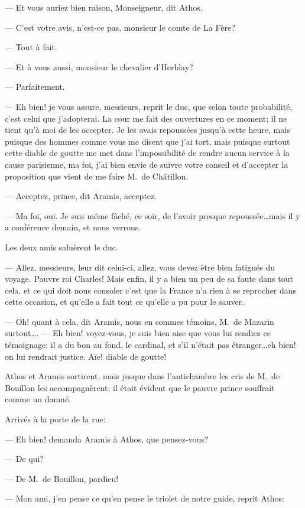 — Et vous auriez bien raison, Monseigneur, dit Athos.

— C'est votre avis, n'est-ce pas, monsieur le comte de La Fère?

— Tout à fait.

— Et à vous aussi, monsieur le chevalier d'Herblay?

— Parfaitement.

— Eh bien! je vous assure, messieurs, reprit le duc, que selon toute probabilité, c'est celui que j'adopterai. La cour me fait des ouvertures en ce moment; il ne tient qu'à moi de les accepter. Je les avais repoussées jusqu'à cette heure, mais puisque des hommes comme vous me disent que j'ai tort, mais puisque surtout cette diable de goutte me met dans l'impossibilité de rendre aucun service à la cause parisienne, ma foi, j'ai bien envie de suivre votre conseil et d'accepter la proposition que vient de me faire M.~de Châtillon.

— Acceptez, prince, dit Aramis, acceptez.

— Ma foi, oui. Je suis même fâché, ce soir, de l'avoir presque repoussée\dots mais il y a conférence demain, et nous verrons.

Les deux amis saluèrent le duc.

— Allez, messieurs, leur dit celui-ci, allez, vous devez être bien fatigués du voyage. Pauvre roi Charles! Mais enfin, il y a bien un peu de sa faute dans tout cela, et ce qui doit nous consoler c'est que la France n'a rien à se reprocher dans cette occasion, et qu'elle a fait tout ce qu'elle a pu pour le sauver.

— Oh! quant à cela, dit Aramis, nous en sommes témoins, M.~de Mazarin surtout\dots.
— Eh bien! voyez-vous, je suis bien aise que vous lui rendiez ce témoignage; il a du bon au fond, le cardinal, et s'il n'était pas étranger\dots eh bien! on lui rendrait justice. Aïe! diable de goutte!

Athos et Aramis sortirent, mais jusque dans l'antichambre les cris de M.~de Bouillon les accompagnèrent; il était évident que le pauvre prince souffrait comme un damné.

Arrivés à la porte de la rue:

— Eh bien! demanda Aramis à Athos, que pensez-vous?

— De qui?

— De M.~de Bouillon, pardieu!

— Mon ami, j'en pense ce qu'en pense le triolet de notre guide, reprit Athos:

